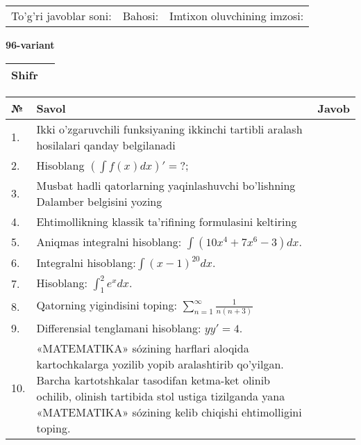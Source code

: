 \documentclass{article}
\begin{document}
  \vspace{1cm}
  
  \begin{tabular}{lll}
  To'g'ri javoblar soni: \underline{\hspace{1.5cm}} & 
  Bahosi: \underline{\hspace{1.5cm}} & 
  Imtixon oluvchining imzosi: \underline{\hspace{2cm}} \\
  \end{tabular}
  
  \egroup
  
  \newpage
  
  
  \textbf{96-variant}\\
  
  \bgroup
  \def\arraystretch{1.6} %
  
  \begin{tabular}{|m{5.7cm}|m{9.5cm}|}
  \hline
  Shifr & \\
  \hline
  \end{tabular}
  
  \vspace{1cm}
  
  \begin{tabular}{|m{0.7cm}|m{10cm}|m{4cm}|}
  \hline
  № & Savol & Javob \\
  \hline
  1. & Ikki o'zgaruvchili funksiyaning ikkinchi tartibli aralash hosilalari qanday belgilanadi &  \\
  \hline
  2. & Hisoblang \(\left( \int {f(x)dx} \right)' = ?\); &  \\
  \hline
  3. & Musbat hadli qatorlarning yaqinlashuvchi bo'lishning Dalamber belgisini yozing &  \\
  \hline
  4. & Ehtimollikning klassik ta'rifining formulasini keltiring &  \\
  \hline
  5. & Aniqmas integralni hisoblang: \(\int {\left( 10x^{4} + 7x^{6} - 3 \right)dx}\). &  \\
  \hline
  6. & Integralni hisoblang:\(\int {(x - 1)^{20}}dx\). &  \\
  \hline
  7. & Hisoblang: \(\int_{1}^{2}{e^{x}dx}\). &  \\
  \hline
  8. & Qatorning yigindisini toping: \(\sum_{n = 1}^{\infty}\frac{1}{n(n + 3)}\) &  \\
  \hline
  9. & Differensial tenglamani hisoblang: \(yy' = 4\). &  \\
  \hline
  10. & «MATEMATIKA» sózining harflari aloqida kartochkalarga yozilib yopib aralashtirib qo'yilgan. Barcha kartotshkalar tasodifan ketma-ket olinib ochilib, olinish tartibida stol ustiga tizilganda yana «MATEMATIKA» sózining kelib chiqishi ehtimolligini toping. &  \\
  \hline
  \end{tabular}
  
\end{document}

